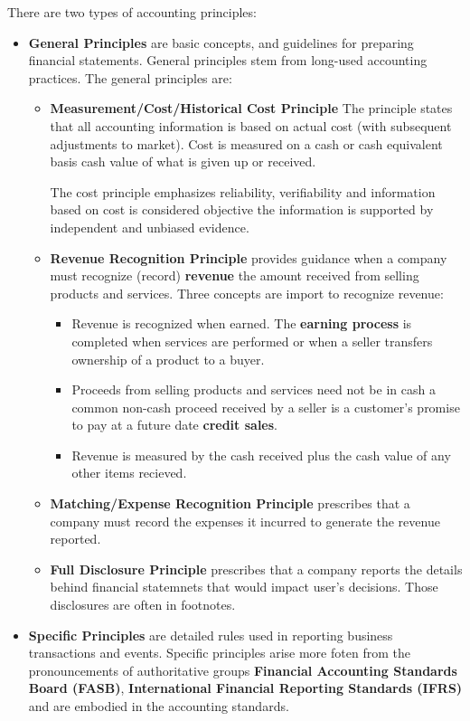 \documentclass[../main.tex]{subfiles}
\begin{document}
	There are two types of accounting principles:
	\begin{itemize}[noitemsep]
		\item \textbf{General Principles} are basic concepts, and guidelines 
		for preparing financial statements. General principles stem from 
		long-used accounting practices. The general principles are:
		\begin{itemize}[noitemsep]
			\item \textbf{Measurement/Cost/Historical Cost Principle} \ie The 
			principle states that all accounting information is based on actual 
			cost (with subsequent adjustments to market). Cost is measured on a 
			cash or cash equivalent basis \ie cash value of what is given up 
			or received. 
			
			The cost principle emphasizes reliability, 
			verifiability and information based on cost is considered objective 
			\ie the information is supported by independent and unbiased 
			evidence.  
			\item \textbf{Revenue Recognition Principle} provides guidance when 
			a company must recognize (record) \textbf{revenue} \ie the amount 
			received from selling products and services. Three concepts are 
			import to recognize revenue:
			\begin{itemize}[noitemsep]
				\item Revenue is recognized when earned. The \textbf{earning 
				process} is completed when services are performed or when a 
				seller transfers ownership of a product to a buyer. 
				\item Proceeds from selling products and services need not be 
				in 
				cash \eg a common non-cash proceed received by a seller is a 
				customer's promise to pay at a future date \ie \textbf{credit 
				sales}. 
				\item Revenue is measured by the cash received plus the cash 
				value of any other items recieved.
			\end{itemize}
			\item \textbf{Matching/Expense Recognition Principle} prescribes 
			that a company must record the expenses it incurred to generate the 
			revenue reported. 
			\item \textbf{Full Disclosure Principle} prescribes that a company 
			reports the details behind financial statemnets that would impact 
			user's decisions. Those disclosures are often in footnotes. 
		\end{itemize}
		\item \textbf{Specific Principles} are detailed rules used in reporting 
		business transactions and events. Specific principles arise more foten 
		from the pronouncements of authoritative groups \eg \textbf{Financial 
		Accounting Standards Board (FASB)}, \textbf{International Financial 
		Reporting Standards (IFRS)} and are embodied in the accounting 
		standards.
	\end{itemize}
	
\end{document}
